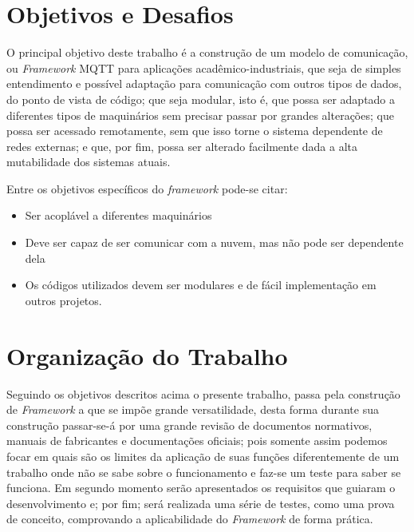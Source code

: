 \section{Objetivos e Desafios}
O principal objetivo deste trabalho é a construção de um modelo de comunicação, ou \textit{Framework} \ac{MQTT} para aplicações
acadêmico-industriais, que seja de simples
entendimento e possível adaptação para comunicação com outros tipos de dados, do ponto de vista de código; que seja 
modular, isto é, que possa ser adaptado a diferentes tipos de maquinários sem precisar passar por grandes alterações;
que possa ser acessado remotamente, sem que isso torne o sistema dependente de redes externas; e que, por fim, possa ser 
alterado facilmente dada a alta mutabilidade dos sistemas atuais.

Entre os objetivos específicos do \textit{framework} pode-se citar:

\begin{itemize}
    \item Ser acoplável a diferentes maquinários
    \item Deve ser capaz de ser comunicar com a nuvem, mas não pode ser dependente dela
    \item Os códigos utilizados devem ser modulares e de fácil implementação em outros projetos.
\end{itemize}

\section{Organização do Trabalho}
Seguindo os objetivos descritos acima o presente trabalho, passa pela construção de \textit{Framework} a que se impõe grande versatilidade,
desta forma durante sua construção passar-se-á por uma grande revisão de documentos normativos, manuais de fabricantes e 
documentações oficiais; pois somente assim podemos focar em quais são os limites da aplicação de suas funções diferentemente
de um trabalho onde não se sabe sobre o funcionamento e faz-se um teste para saber se funciona. Em segundo momento serão 
apresentados os requisitos que guiaram o desenvolvimento e; por fim; será realizada uma série de testes, como uma prova de
conceito, comprovando a aplicabilidade do \textit{Framework} de forma prática.

